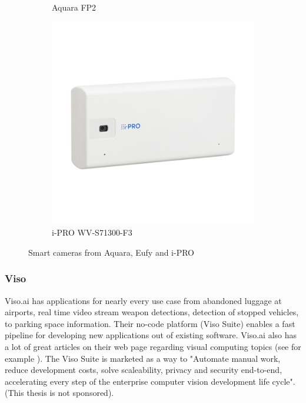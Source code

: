\begin{figure}[H]
\begin{subfigure}{0.3\textwidth}
        \caption{Aquara FP2}
        \label{fig:aquara_fp2}
    \end{subfigure}
    \hfill
    \begin{subfigure}{0.3\textwidth}
        \centering
        \includegraphics[width=\textwidth]{Images/Products/iPRO_wv-s71300-f3.png}
        \caption{i-PRO WV-S71300-F3}
        \label{fig:i-PRO_camera}
    \end{subfigure}
    \caption{Smart cameras from Aquara, Eufy and i-PRO}
    \label{fig:solutions_on_the_market}
\end{figure}

\subsubsection{Viso}
\label{sec:viso}
Viso.ai has applications for nearly every use case from abandoned luggage at airports, real time video stream weapon detections, detection of stopped vehicles, to parking space information. Their no-code platform (Viso Suite) enables a fast pipeline for developing new applications out of existing software. Viso.ai also has a lot of great articles on their web page regarding visual computing topics (see for example \cite{bo2023yolov7_guide}). The Viso Suite is marketed as a way to "Automate manual work, reduce development costs, solve scaleability, privacy and security end-to-end, accelerating every step of the enterprise computer vision development life cycle". (This thesis is not sponsored).

